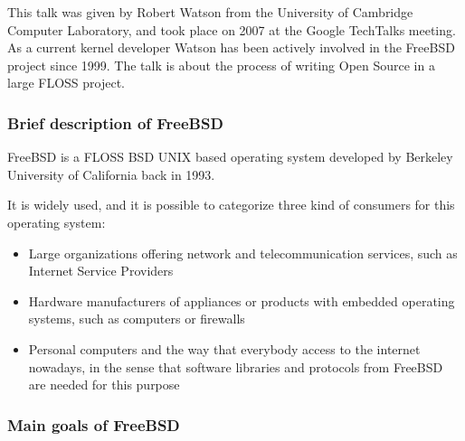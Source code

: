 \documentclass[11pt]{article} %
\begin{document}
This talk was given by Robert Watson from the University of Cambridge Computer Laboratory, and took place on 2007 at the Google TechTalks meeting. As a current kernel developer Watson has been actively involved in the FreeBSD project since 1999. The talk is about the process of writing Open Source in a large FLOSS project.


\subsubsection{Brief description of FreeBSD}

FreeBSD is a FLOSS BSD UNIX based operating system developed by Berkeley University of California back in 1993.

It is widely used, and it is possible to categorize three kind of consumers for this operating system:

\begin{itemize}
  \item Large organizations offering network and telecommunication services, such as Internet Service Providers
  \item Hardware manufacturers of appliances or products with embedded operating systems, such as computers or firewalls
  \item Personal computers and the way that everybody access to the internet nowadays, in the sense that software libraries and protocols from FreeBSD are needed for this purpose
\end{itemize}


\subsubsection{Main goals of FreeBSD}
\end{document}
